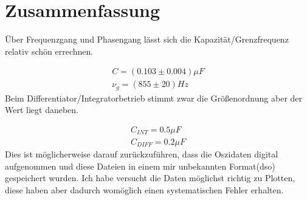 \documentclass[a4paper]{article}
\begin{document}
\section{Zusammenfassung}
Über Frequenzgang und Phasengang lässt sich die Kapazität/Grenzfrequenz relativ schön errechnen.

\begin{align}
  C =(0.103 \pm 0.004)\mu F\\
  \nu_g = (855\pm20)Hz  
\end{align}
Beim Differentiator/Integratorbetrieb stimmt zwar die Größenordnung aber der Wert liegt daneben.

\begin{align}
  C_{INT} = 0.5 \mu F\\
  C_{DIFF} = 0.2 \mu F
\end{align}
Dies ist möglicherweise darauf zurückzuführen, dass die Oszidaten digital aufgenommen und diese Dateien in einem mir unbekannten Format(dso) gespeichert wurden. Ich habe versucht die Daten möglichst richtig zu Plotten, diese haben aber dadurch womöglich einen systematischen Fehler erhalten.
\end{document}
